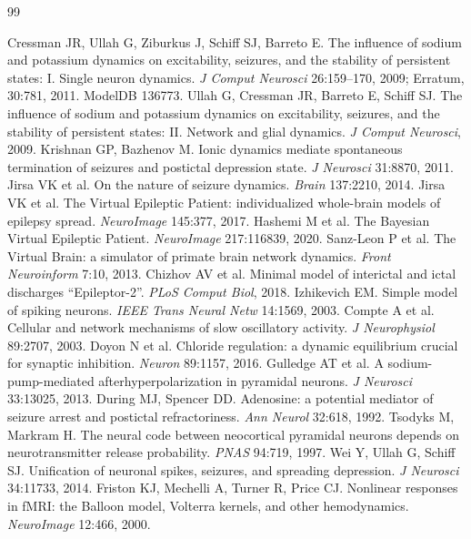 \begin{thebibliography}{99}
\small

 Cressman JR, Ullah G, Ziburkus J, Schiff SJ, Barreto E. The influence of sodium and potassium dynamics on excitability, seizures, and the stability of persistent states: I. Single neuron dynamics. \emph{J Comput Neurosci} 26:159--170, 2009; Erratum, 30:781, 2011. ModelDB 136773.
 Ullah G, Cressman JR, Barreto E, Schiff SJ. The influence of sodium and potassium dynamics on excitability, seizures, and the stability of persistent states: II. Network and glial dynamics. \emph{J Comput Neurosci}, 2009.
 Krishnan GP, Bazhenov M. Ionic dynamics mediate spontaneous termination of seizures and postictal depression state. \emph{J Neurosci} 31:8870, 2011.
 Jirsa VK et al. On the nature of seizure dynamics. \emph{Brain} 137:2210, 2014.
 Jirsa VK et al. The Virtual Epileptic Patient: individualized whole-brain models of epilepsy spread. \emph{NeuroImage} 145:377, 2017.
 Hashemi M et al. The Bayesian Virtual Epileptic Patient. \emph{NeuroImage} 217:116839, 2020.
 Sanz-Leon P et al. The Virtual Brain: a simulator of primate brain network dynamics. \emph{Front Neuroinform} 7:10, 2013.
 Chizhov AV et al. Minimal model of interictal and ictal discharges ``Epileptor-2''. \emph{PLoS Comput Biol}, 2018.
 Izhikevich EM. Simple model of spiking neurons. \emph{IEEE Trans Neural Netw} 14:1569, 2003.
 Compte A et al. Cellular and network mechanisms of slow oscillatory activity. \emph{J Neurophysiol} 89:2707, 2003.
 Doyon N et al. Chloride regulation: a dynamic equilibrium crucial for synaptic inhibition. \emph{Neuron} 89:1157, 2016.
 Gulledge AT et al. A sodium-pump-mediated afterhyperpolarization in pyramidal neurons. \emph{J Neurosci} 33:13025, 2013.
 During MJ, Spencer DD. Adenosine: a potential mediator of seizure arrest and postictal refractoriness. \emph{Ann Neurol} 32:618, 1992.
 Tsodyks M, Markram H. The neural code between neocortical pyramidal neurons depends on neurotransmitter release probability. \emph{PNAS} 94:719, 1997.
 Wei Y, Ullah G, Schiff SJ. Unification of neuronal spikes, seizures, and spreading depression. \emph{J Neurosci} 34:11733, 2014.
 Friston KJ, Mechelli A, Turner R, Price CJ. Nonlinear responses in fMRI: the Balloon model, Volterra kernels, and other hemodynamics. \emph{NeuroImage} 12:466, 2000.

\end{thebibliography}
